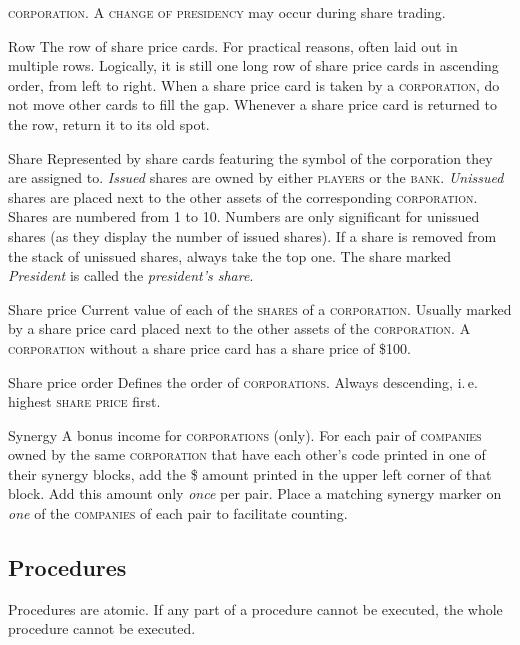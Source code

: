 \documentclass[11pt,a4paper]{article}
\newenvironment{my_description}
  {\begin{list}{}{\setlength{\labelwidth}{0pt}
   \leftmargin=1.2em
   \setlength{\itemindent}{-\leftmargin}
   \renewcommand{\makelabel}{\descriptionlabel}}
  \setlength{\itemsep}{1pt}
  \setlength{\parskip}{0pt}
  \setlength{\parsep}{0pt}
  }
  {\end{list}}
\begin{document}
\begin{multicols}{2}
{\begin{my_description}
  \textsc{corporation}. A \textsc{change of presidency} may occur
  during share trading.
\item[Row] The row of share price cards. For practical reasons, often
  laid out in multiple rows. Logically, it is still one long row of
  share price cards in ascending order, from left to right. When a
  share price card is taken by a \textsc{corporation}, do not move
  other cards to fill the gap. Whenever a share price card is
  returned to the row, return it to its old spot.
\item[Share] Represented by share cards featuring the symbol of the
  corporation they are assigned to. \emph{Issued} shares are owned by
  either \textsc{players} or the \textsc{bank}. \emph{Unissued} shares
  are placed next to the other assets of the corresponding
  \textsc{corporation}. Shares are numbered from 1 to 10. Numbers are
  only significant for unissued shares (as they display the number of
  issued shares). If a share is removed from the stack of unissued
  shares, always take the top one. The share marked \emph{President}
  is called the \emph{president's share}.
\item[Share price] Current value of each of the \textsc{shares} of a
  \textsc{corporation}. Usually marked by a share price card placed
  next to the other assets of the \textsc{corporation}. A
  \textsc{corporation} without a share price card has a share price of
  \$100.
\item[Share price order] Defines the order of
  \textsc{corporations}. Always descending, i.\,e. highest
  \textsc{share price} first.
\item[Synergy] A bonus income for \textsc{corporations} (only). For
  each pair of \textsc{companies} owned by the same
  \textsc{corporation} that have each other's code printed in one of
  their synergy blocks, add the \$ amount printed in the upper left
  corner of that block. Add this amount only \emph{once} per
  pair. Place a matching synergy marker on \emph{one} of the
  \textsc{companies} of each pair to facilitate counting.

\end{my_description}

\subsection*{Procedures}

Procedures are atomic. If any part of a procedure cannot be executed,
the whole procedure cannot be executed.

}
\end{multicols}
\end{document}
